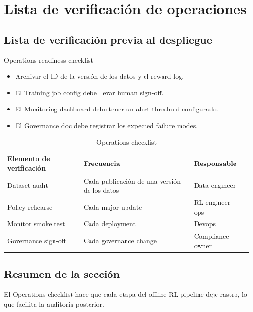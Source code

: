 \section{Lista de verificación de operaciones}

\subsection{Lista de verificación previa al despliegue}

\begin{knowledgebox}{Operations readiness checklist}
\begin{itemize}
    \item Archivar el ID de la versión de los datos y el reward log.
    \item El Training job config debe llevar human sign-off.
    \item El Monitoring dashboard debe tener un alert threshold configurado.
    \item El Governance doc debe registrar los expected failure modes.
\end{itemize}
\end{knowledgebox}

\begin{table}[H]
\centering
\begin{tabular}{p{} p{} p{}}
\toprule
Elemento de verificación & Frecuencia & Responsable \\
\midrule
Dataset audit & Cada publicación de una versión de los datos & Data engineer \\
Policy rehearse & Cada major update & RL engineer + ops \\
Monitor smoke test & Cada deployment & Devops \\
Governance sign-off & Cada governance change & Compliance owner \\
\bottomrule
\end{tabular}
\caption{Operations checklist}
\end{table}

\subsection{Resumen de la sección}

El Operations checklist hace que cada etapa del offline RL pipeline deje rastro, lo que facilita la auditoría posterior.

